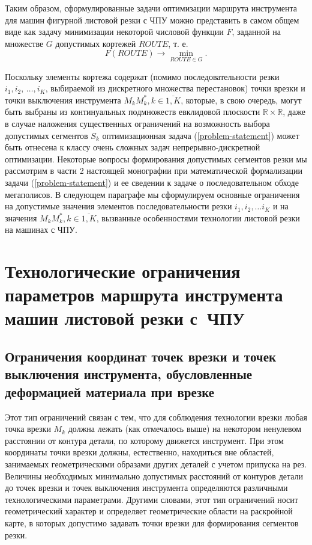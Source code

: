 \documentclass[11pt,twoside,openany]{report}
\newcounter{lem}
\begin{document}
Таким образом, сформулированные задачи оптимизации
маршрута инструмента для машин фигурной листовой резки с ЧПУ
можно представить в самом общем виде
как задачу минимизации некоторой числовой функции $F$,
заданной на множестве $G$ допустимых кортежей $ROUTE$,
т. е.
\begin{equation}
  F(ROUTE) \to \min_{ROUTE \in G}
  .
  \label{problem-statement}
\end{equation}

Поскольку элементы кортежа содержат
(помимо последовательности резки
$i_1, i_2, \,\dots, i_K$,
выбираемой из дискретного множества перестановок)
точки врезки и точки выключения инструмента
$M_kM_k^*, k \in \overline{1,K}$,
которые, в свою очередь,
могут быть выбраны из континуальных подмножеств евклидовой плоскости
$\mathbb R \times \mathbb R$,
даже в случае наложения существенных ограничений
на возможность выбора допустимых сегментов
$S_k$
оптимизационная задача (\ref{problem-statement})
может быть отнесена к классу очень сложных задач
непрерывно-дискретной оптимизации.
Некоторые вопросы формирования допустимых сегментов резки мы рассмотрим в части 2
настоящей монографии при математической формализации задачи (\ref{problem-statement})
и ее сведении к задаче о последовательном обходе мегаполисов.
В следующем параграфе мы сформулируем основные ограничения
на допустимые значения элементов последовательности резки
$i_1, i_2, \dots i_K$
и на значения
$M_kM_k^*, k \in \overline{1,K}$,
вызванные особенностями технологии листовой резки на машинах с ЧПУ.

{\raggedright\section{
  Технологические ограничения параметров маршрута инструмента
  машин листовой резки с~ЧПУ
}}
\label{sect:1.3}
\setcounter{equation}{0}

{\raggedright\subsection{
  Ограничения координат точек врезки и точек выключения инструмента,
  обусловленные деформацией материала при врезке
}}

Этот тип ограничений связан с тем,
что для соблюдения технологии врезки любая точка врезки
$M_k$
должна лежать (как отмечалось выше)
на некотором ненулевом расстоянии от контура детали,
по которому движется инструмент.
При этом координаты точки врезки должны,
естественно, находиться вне областей,
занимаемых геометрическими образами других деталей с учетом припуска на рез.
Величины необходимых минимально допустимых расстояний
от контуров детали до точек врезки и точек выключения
инструмента определяются различными технологическими параметрами.
Другими словами, этот тип ограничений носит геометрический характер
и определяет геометрические области на раскройной карте,
в которых допустимо задавать точки врезки для формирования сегментов резки.
\end{document}
